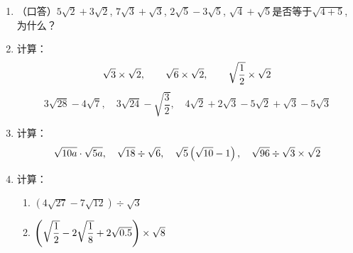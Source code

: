 \begin{ex}
\begin{enumerate}
    \item （口答）$5\sqrt{2}+3\sqrt{2}$, $7\sqrt{3}+\sqrt{3}$, $2\sqrt{5}-3\sqrt{5}$, $\sqrt{4}+\sqrt{5}$是否等于$\sqrt{4+5}$, 为什么？

    \item 计算：
    \[\sqrt{3}\times \sqrt{2},\qquad \sqrt{6}\times \sqrt{2},\qquad \sqrt{\dfrac{1}{2}}\times \sqrt{2}\]
    \[3\sqrt{28}-4\sqrt{7},\quad 3\sqrt{24}-\sqrt{\frac{3}{2}},\quad 4\sqrt{2}+2\sqrt{3}-5\sqrt{2}+\sqrt{3}-5\sqrt{3}\]

    \item 计算：
    \[\sqrt{10a}\cdot \sqrt{5a},\quad \sqrt{18}\div \sqrt{6},\quad \sqrt{5}\left(\sqrt{10}-1\right),\quad \sqrt{96}\div \sqrt{3}\times \sqrt{2}\]
    \item 计算：
    \begin{enumerate}
        \item $\left(4\sqrt{27}-7\sqrt{12}\right)\div \sqrt{3}$
        \item $\left(\sqrt{\dfrac{1}{2}}-2\sqrt{\dfrac{1}{8}}+2\sqrt{0.5}\right)\times \sqrt{8}$
    \end{enumerate}
\end{enumerate}
\end{ex}

